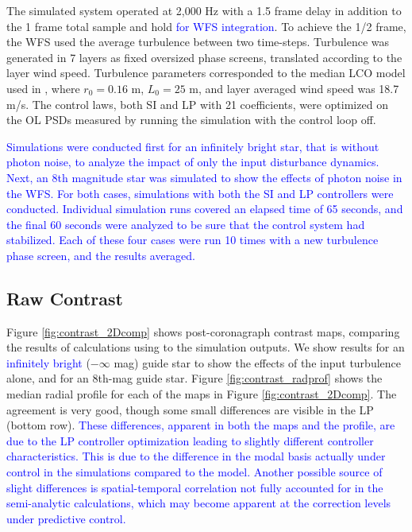 \documentclass[10pt,preprint]{aastex631}
\newcommand{\jrmadd}[1]{\textcolor{blue}{#1}}
\begin{document}
The simulated system operated at 2,000 Hz with a 1.5 frame delay in addition to the 1 frame total sample and hold \jrmadd{for WFS integration}.  To achieve the 1/2 frame, the WFS used the average turbulence between two time-steps.  Turbulence was generated in 7 layers as fixed oversized phase screens, translated according to the layer wind speed.   Turbulence parameters corresponded to the median LCO model used in \citet{2018JATIS...4a9001M}, where $r_0 = 0.16$ m, $L_0 = 25$ m, and layer averaged wind speed was 18.7 m/s.  The control laws, both SI and LP with 21 coefficients, were optimized on the OL PSDs measured by running the simulation with the control loop off.

\jrmadd{Simulations were conducted first for an infinitely bright star, that is without photon noise, to analyze the impact of only the input disturbance dynamics.  Next, an 8th magnitude star was simulated to show the effects of photon noise in the WFS.  For both cases, simulations with both the SI and LP controllers were conducted.  Individual simulation runs covered an elapsed time of 65 seconds, and the final 60 seconds were analyzed to be sure that the control system had stabilized.  Each of these four cases were run 10 times with a new turbulence phase screen, and the results averaged.}

\subsection{Raw Contrast}
Figure \ref{fig:contrast_2Dcomp} shows post-coronagraph contrast maps, comparing the results of calculations using \citet{2018JATIS...4a9001M} to the simulation outputs.  We show results for an \jrmadd{infinitely bright} ($-\infty$ mag) guide star to show the effects of the input turbulence alone, and for an $8$th-mag guide star.   Figure \ref{fig:contrast_radprof} shows the median radial profile for each of the maps in Figure \ref{fig:contrast_2Dcomp}.  The agreement is very good, though some small differences are visible in the LP (bottom row). \jrmadd{These differences, apparent in both the maps and the profile, are due to the LP controller optimization leading to slightly different controller characteristics.  This is due to the difference in the modal basis actually under control in the simulations compared to the model. Another possible source of slight differences is spatial-temporal correlation not fully accounted for in the semi-analytic calculations, which may become apparent at the correction levels under predictive control.}
\end{document}
